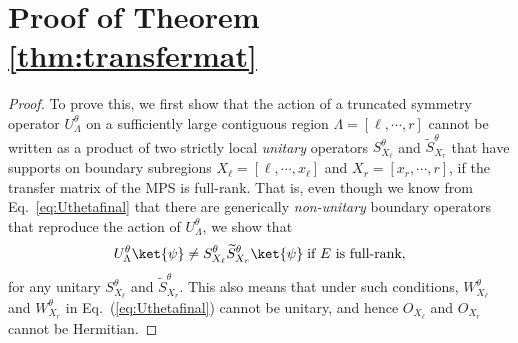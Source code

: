 \documentclass[prx,letterpaper,aps,superscriptaddress,floatfix,twocolumn,nofootinbib]{revtex4-2}
\theoremstyle{definition}
\begin{document}
\section{Proof of Theorem \ref{thm:transfermat}}
\label{app:transfermatrix}
%
\begin{proof}
%
To prove this, we first show that the action of a truncated symmetry operator $U^\theta_\Lambda$ on a sufficiently large contiguous region $\Lambda = [\ell, \cdots, r]$ cannot be written as a product of two strictly local \textit{unitary} operators $S^\theta_{X_\ell}$ and $\widetilde{S}^\theta_{X_r}$ that have supports on boundary subregions $X_\ell = [\ell, \cdots, x_\ell]$ and $X_r = [x_r, \cdots, r]$, if the transfer matrix of the MPS is full-rank.
%
That is, even though we know from Eq.~\eqref{eq:Uthetafinal} that there are generically \textit{non-unitary} boundary operators that reproduce the action of $U^\theta_\Lambda$, we show that
\begin{equation}
        U^\theta_\Lambda\ket{\psi} \neq  S^\theta_{X_\ell} \widetilde{S}^\theta_{X_r}\ket{\psi}\;\text{if $E$ is full-rank},
\label{eq:Uthetacondition}
\end{equation}
for any unitary $S^\theta_{X_\ell}$ and $\widetilde{S}^\theta_{X_r}$.
%
This also means that under such conditions, $W^\theta_{X_\ell}$ and $W^\theta_{X_r}$ in Eq.~(\ref{eq:Uthetafinal}) cannot be unitary, and hence $O_{X_\ell}$ and $O_{X_r}$ cannot be Hermitian. 
%


\end{proof}
\end{document}

